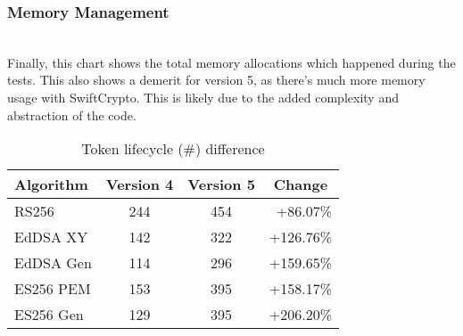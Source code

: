 \subsubsection*{Memory Management}
 \\
Finally, this chart shows the total memory allocations which happened during the tests. This also shows a demerit for version 5, as there's much more memory usage with SwiftCrypto. This is likely due to the added complexity and abstraction of the code.
\begin{table}[ht]
    \centering
    \begin{tabular}{lccr}
        \toprule
        Algorithm & Version 4 & Version 5 & \multicolumn{1}{c}{Change} \\
        \midrule
        RS256 & 244 & 454 & \textcolor{darkerred}{+86.07\%} \\
        EdDSA XY & 142 & 322 & \textcolor{darkerred}{+126.76\%} \\
        EdDSA Gen & 114 & 296 & \textcolor{darkerred}{+159.65\%} \\
        ES256 PEM & 153 & 395 & \textcolor{darkerred}{+158.17\%} \\
        ES256 Gen & 129 & 395 & \textcolor{darkergreen}{+206.20\%} \\
        \bottomrule
    \end{tabular}
    \caption{Token lifecycle  (\#) difference}
\end{table}


